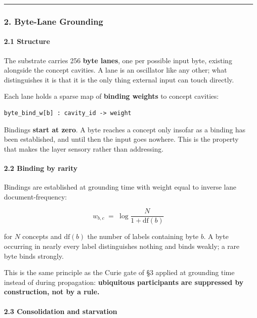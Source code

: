 \documentclass[
  11pt,
  a4paper,
]{article}
\begin{document}
\begin{center}\rule{0.5\linewidth}{0.5pt}\end{center}

\subsubsection{2. Byte-Lane Grounding}\label{byte-lane-grounding}

\paragraph{2.1 Structure}\label{structure}

The substrate carries 256 \textbf{byte lanes}, one per possible input
byte, existing alongside the concept cavities. A lane is an oscillator
like any other; what distinguishes it is that it is the only thing
external input can touch directly.

Each lane holds a sparse map of \textbf{binding weights} to concept
cavities:

\begin{verbatim}
byte_bind_w[b] : cavity_id -> weight
\end{verbatim}

Bindings \textbf{start at zero}. A byte reaches a concept only insofar
as a binding has been established, and until then the input goes
nowhere. This is the property that makes the layer sensory rather than
addressing.

\paragraph{2.2 Binding by rarity}\label{binding-by-rarity}

Bindings are established at grounding time with weight equal to inverse
lane document-frequency:

\[
w_{b,c} \;=\; \log \frac{N}{1 + \mathrm{df}(b)}
\]

for \(N\) concepts and \(\mathrm{df}(b)\) the number of labels
containing byte \(b\). A byte occurring in nearly every label
distinguishes nothing and binds weakly; a rare byte binds strongly.

This is the same principle as the Curie gate of §3 applied at grounding
time instead of during propagation: \textbf{ubiquitous participants are
suppressed by construction, not by a rule.}

\paragraph{2.3 Consolidation and
starvation}\label{consolidation-and-starvation}
\end{document}
